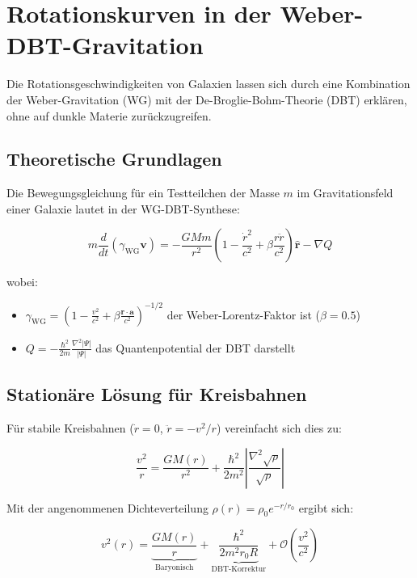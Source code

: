 \newpage
\section{Rotationskurven in der Weber-DBT-Gravitation}
Die Rotationsgeschwindigkeiten von Galaxien lassen sich durch eine Kombination der Weber-Gravitation (WG) mit der De-Broglie-Bohm-Theorie (DBT) erklären, ohne auf dunkle Materie zurückzugreifen. 

\subsection{Theoretische Grundlagen}
Die Bewegungsgleichung für ein Testteilchen der Masse $m$ im Gravitationsfeld einer Galaxie lautet in der WG-DBT-Synthese:

\begin{equation}
m \frac{d}{dt}(\gamma_{\text{WG}} \mathbf{v}) = -\frac{GMm}{r^2}\left(1 - \frac{\dot{r}^2}{c^2} + \beta \frac{r\ddot{r}}{c^2}\right)\hat{\mathbf{r}} - \nabla Q
\end{equation}

wobei:
\begin{itemize}
\item $\gamma_{\text{WG}} = \left(1 - \frac{v^2}{c^2} + \beta \frac{\mathbf{r}\cdot\mathbf{a}}{c^2}\right)^{-1/2}$ der Weber-Lorentz-Faktor ist ($\beta = 0.5$)
\item $Q = -\frac{\hbar^2}{2m}\frac{\nabla^2|\Psi|}{|\Psi|}$ das Quantenpotential der DBT darstellt
\end{itemize}

\subsection{Stationäre Lösung für Kreisbahnen}
Für stabile Kreisbahnen ($\dot{r} = 0$, $\ddot{r} = -v^2/r$) vereinfacht sich dies zu:

\begin{equation}
\frac{v^2}{r} = \frac{GM(r)}{r^2} + \frac{\hbar^2}{2m^2}\left|\frac{\nabla^2\sqrt{\rho}}{\sqrt{\rho}}\right|
\end{equation}

Mit der angenommenen Dichteverteilung $\rho(r) = \rho_0 e^{-r/r_0}$ ergibt sich:

\begin{equation}
v^2(r) = \underbrace{\frac{GM(r)}{r}}_{\text{Baryonisch}} + \underbrace{\frac{\hbar^2}{2m^2 r_0 R}}_{\text{DBT-Korrektur}} + \mathcal{O}\left(\frac{v^2}{c^2}\right)
\end{equation}

